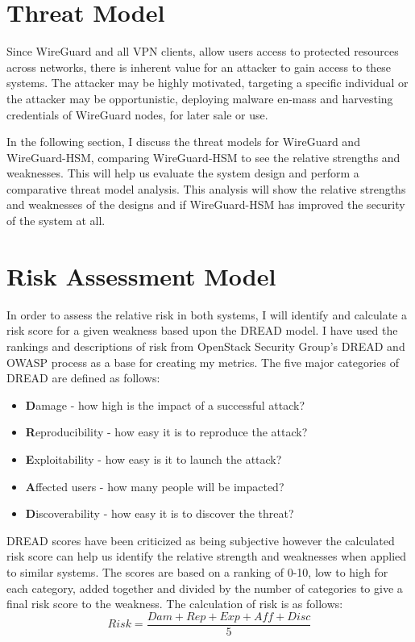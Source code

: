 \documentclass [11pt, proquest] {uwthesis}[2020/02/24]
\begin{document}
\section{Threat Model}
Since WireGuard and all VPN clients, allow users access to protected resources across networks, there is inherent value for an attacker to gain access to these systems.
The attacker may be highly motivated, targeting a specific individual or the attacker may be opportunistic, deploying malware en-mass and harvesting credentials of WireGuard nodes, for later sale or use.

In the following section, I discuss the threat models for WireGuard and WireGuard-HSM, comparing WireGuard-HSM to see the relative strengths and weaknesses. This will help us evaluate the system design and perform a comparative threat model analysis. This analysis will show the relative strengths and weaknesses of the designs and if WireGuard-HSM has improved the security of the system at all.

\section{Risk Assessment Model}
In order to assess the relative risk in both systems, I will identify and calculate a risk score for a given weakness based upon the DREAD model. I have used the rankings and descriptions of risk from OpenStack Security Group's DREAD and OWASP process \cite{openstack_securityossa-metrics_2022}\cite{owasp_threat_2022} as a base for creating my metrics. The five major categories of DREAD are defined as follows:

\begin{itemize}
  \item \textbf{D}amage - how high is the impact of a successful attack?
  \item \textbf{R}eproducibility - how easy it is to reproduce the attack? 
  \item \textbf{E}xploitability - how easy is it to launch the attack?
  \item \textbf{A}ffected users - how many people will be impacted?
  \item \textbf{D}iscoverability - how easy it is to discover the threat?
\end{itemize}
\bigskip

\label{dread}
DREAD scores have been criticized as being subjective however the calculated risk score can help us identify the relative strength and weaknesses when applied to similar systems. The scores are based on a ranking of 0-10, low to high for each category, added together and divided by the number of categories to give a final risk score to the weakness. 
The calculation of risk is as follows:
\begin{equation}
Risk = \frac{Dam + Rep + Exp + Aff + Disc }{5}
\end{equation}
\end{document}
